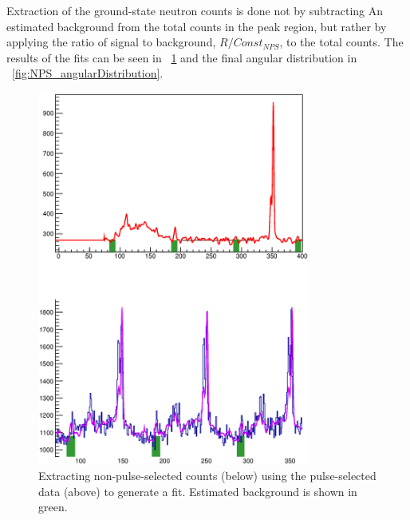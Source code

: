 Extraction of the ground-state neutron counts is done not by subtracting An estimated background from the total counts in the peak region, but rather by applying the ratio of signal to background, $R/Const_{NPS}$, to the total counts.  The results of the fits can be seen in {\fig}~\ref{fig:NPS_fits} and the final angular distribution in {\fig}~\ref{fig:NPS_angularDistribution}.
\begin{figure}[!htbp]
\centering
\includegraphics[width=0.8\textwidth]{figures/PDE_1.eps}
\caption{Extracting non-pulse-selected counts (below) using the pulse-selected data (above) to generate a fit.  Estimated background is shown in green.}
\label{fig:NPS_fits}
\end{figure}


